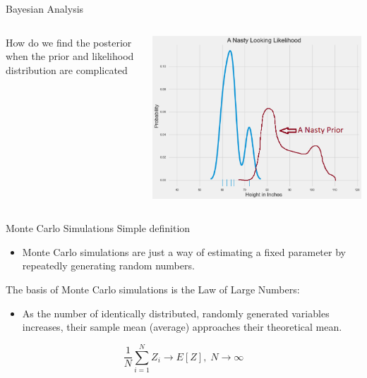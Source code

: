 \documentclass[12pt, aspectratio=149]{beamer}
\theoremstyle{plain}
\begin{document}
\begin{frame}{Bayesian Analysis}
\begin{columns}
\begin{column}{0.5\linewidth}
How do we find the posterior when the prior and likelihood distribution are complicated
\end{column}
\begin{column}{0.5\linewidth}
\includegraphics[scale=0.2]{figs/nasty_prior_posterior_example.png}
\end{column}
\end{columns}
\end{frame}

\begin{frame}[fragile]{Monte Carlo Simulations}
Simple definition
\begin{itemize}
\item Monte Carlo simulations are just a way of estimating a fixed parameter by repeatedly generating random numbers. 
\end{itemize}
The basis of Monte Carlo simulations is the Law of Large Numbers:
\begin{itemize}
\item As the number of identically distributed, randomly generated variables increases, their sample mean (average) approaches their theoretical mean.
\end{itemize}
\begin{equation}
\frac{1}{N}\sum^{N}_{i=1}Z_i \rightarrow E[Z],\; N\rightarrow \infty
\end{equation}
\end{frame}
\end{document}
